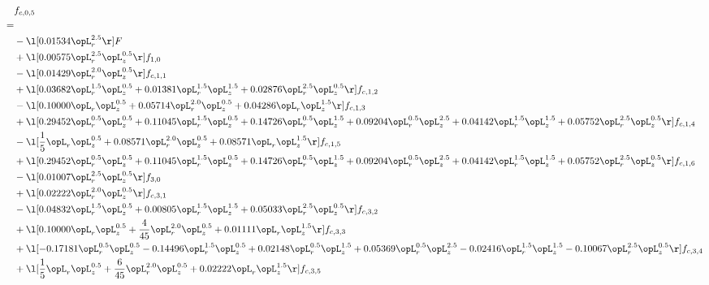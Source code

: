 \begin{alignat}{2} 
\label{eq:f_05_1} 
& f_{c,0,5} \nonumber \\ 
 = \\ 
& - \l[  0.01534 \opL_r^{2.5}  \r] F \nonumber \\ 
& + \l[  0.00575 \opL_r^{2.5} \opL_z^{0.5}  \r] f_{1,0} \nonumber \\ 
& - \l[  0.01429 \opL_r^{2.0} \opL_z^{0.5}  \r] f_{c,1,1} \nonumber \\ 
& + \l[  0.03682 \opL_r^{1.5} \opL_z^{0.5} +  0.01381 \opL_r^{1.5} \opL_z^{1.5} +  0.02876 \opL_r^{2.5} \opL_z^{0.5}  \r] f_{c,1,2} \nonumber \\ 
& - \l[  0.10000 \opL_r \opL_z^{0.5} +  0.05714 \opL_r^{2.0} \opL_z^{0.5} +  0.04286 \opL_r \opL_z^{1.5}  \r] f_{c,1,3} \nonumber \\ 
& + \l[  0.29452 \opL_r^{0.5} \opL_z^{0.5} +  0.11045 \opL_r^{1.5} \opL_z^{0.5} +  0.14726 \opL_r^{0.5} \opL_z^{1.5} +  0.09204 \opL_r^{0.5} \opL_z^{2.5} +  0.04142 \opL_r^{1.5} \opL_z^{1.5} +  0.05752 \opL_r^{2.5} \opL_z^{0.5}  \r] f_{c,1,4} \nonumber \\ 
& - \l[ \frac{1}{5} \opL_r \opL_z^{0.5} +  0.08571 \opL_r^{2.0} \opL_z^{0.5} +  0.08571 \opL_r \opL_z^{1.5}  \r] f_{c,1,5} \nonumber \\ 
& + \l[  0.29452 \opL_r^{0.5} \opL_z^{0.5} +  0.11045 \opL_r^{1.5} \opL_z^{0.5} +  0.14726 \opL_r^{0.5} \opL_z^{1.5} +  0.09204 \opL_r^{0.5} \opL_z^{2.5} +  0.04142 \opL_r^{1.5} \opL_z^{1.5} +  0.05752 \opL_r^{2.5} \opL_z^{0.5}  \r] f_{c,1,6} \nonumber \\ 
& - \l[  0.01007 \opL_r^{2.5} \opL_z^{0.5}  \r] f_{3,0} \nonumber \\ 
& + \l[  0.02222 \opL_r^{2.0} \opL_z^{0.5}  \r] f_{c,3,1} \nonumber \\ 
& - \l[  0.04832 \opL_r^{1.5} \opL_z^{0.5} +  0.00805 \opL_r^{1.5} \opL_z^{1.5} +  0.05033 \opL_r^{2.5} \opL_z^{0.5}  \r] f_{c,3,2} \nonumber \\ 
& + \l[  0.10000 \opL_r \opL_z^{0.5} + \frac{4}{45} \opL_r^{2.0} \opL_z^{0.5} +  0.01111 \opL_r \opL_z^{1.5}  \r] f_{c,3,3} \nonumber \\ 
& + \l[  -0.17181 \opL_r^{0.5} \opL_z^{0.5}   -0.14496 \opL_r^{1.5} \opL_z^{0.5} +  0.02148 \opL_r^{0.5} \opL_z^{1.5} +  0.05369 \opL_r^{0.5} \opL_z^{2.5}   -0.02416 \opL_r^{1.5} \opL_z^{1.5}   -0.10067 \opL_r^{2.5} \opL_z^{0.5}  \r] f_{c,3,4} \nonumber \\ 
& + \l[ \frac{1}{5} \opL_r \opL_z^{0.5} + \frac{6}{45} \opL_r^{2.0} \opL_z^{0.5} +  0.02222 \opL_r \opL_z^{1.5}  \r] f_{c,3,5} \nonumber \\ 

\end{alignat}
